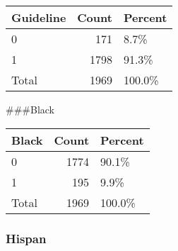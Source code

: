 \documentclass[]{article}
\newenvironment{Shaded}{\begin{snugshade}}{\end{snugshade}}
\newcommand{\DataTypeTok}[1]{\textcolor[rgb]{0.13,0.29,0.53}{#1}}
\newcommand{\KeywordTok}[1]{\textcolor[rgb]{0.13,0.29,0.53}{\textbf{#1}}}
\newcommand{\NormalTok}[1]{#1}
\newcommand{\OperatorTok}[1]{\textcolor[rgb]{0.81,0.36,0.00}{\textbf{#1}}}
\newcommand{\OtherTok}[1]{\textcolor[rgb]{0.56,0.35,0.01}{#1}}
\newcommand{\StringTok}[1]{\textcolor[rgb]{0.31,0.60,0.02}{#1}}
\begin{document}
\begin{table}[H]
\centering
\begin{tabular}{l|r|l}
\hline
Guideline & Count & Percent\\
\hline
0 & 171 & 8.7\%\\
\hline
1 & 1798 & 91.3\%\\
\hline
Total & 1969 & 100.0\%\\
\hline
\end{tabular}
\end{table}

\#\#\#Black

\begin{Shaded}
\end{Shaded}

\begin{table}[H]
\centering
\begin{tabular}{l|r|l}
\hline
Black & Count & Percent\\
\hline
0 & 1774 & 90.1\%\\
\hline
1 & 195 & 9.9\%\\
\hline
Total & 1969 & 100.0\%\\
\hline
\end{tabular}
\end{table}

\hypertarget{hispan}{%
\subsubsection{Hispan}\label{hispan}}
\end{document}
